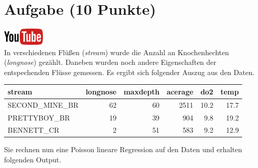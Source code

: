\documentclass[a4paper, 10pt]{scrartcl}\usepackage[]{graphicx}\usepackage[]{xcolor}
\newenvironment{knitrout}{}{} %
\begin{document}
\clearpage

\section{Aufgabe \hfill (10 Punkte)}

\hfill\href{https://youtu.be/K_28Ne6ladI}{\includegraphics[width =
  2cm]{img/youtube}}\\[1Ex]




In verschiedenen Fl{\"u}{\ss}en (\textit{stream}) wurde die Anzahl an
Knochenhechten (\textit{longnose}) gez{\"a}hlt. Daneben wurden noch andere
Eigenschaften der entspechenden Fl{\"u}sse gemessen. Es ergibt sich folgender
Auszug aus den Daten. 


\begin{knitrout}
\color{fgcolor}\begin{table}[!h]
\centering
\begin{tabular}{lrrrrr}
\toprule
stream & longnose & maxdepth & acerage & do2 & temp\\
\midrule
SECOND\_MINE\_BR & 62 & 60 & 2511 & 10.2 & 17.7\\
PRETTYBOY\_BR & 19 & 39 & 904 & 9.8 & 19.2\\
BENNETT\_CR & 2 & 51 & 583 & 9.2 & 12.9\\
\bottomrule
\end{tabular}
\end{table}

\end{knitrout}


Sie rechnen nun eine Poisson lineare Regression auf den Daten und erhalten
folgenden \Rlogo Output.
\end{document}
